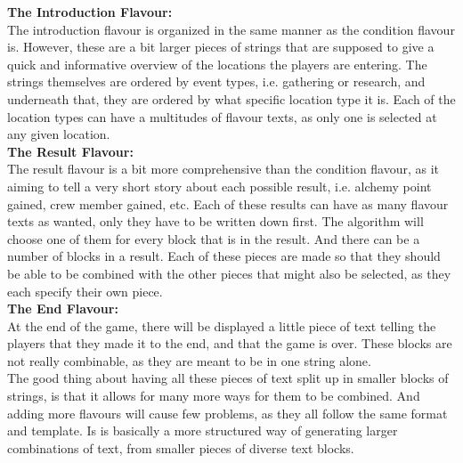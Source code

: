 \textbf{The Introduction Flavour:}\\

The introduction flavour is organized in the same manner as the condition flavour is. However, these are a bit larger pieces of strings that are supposed to give a quick and informative overview of the locations the players are entering. The strings themselves are ordered by event types, i.e. gathering or research, and underneath that, they are ordered by what specific location type it is. Each of the location types can have a multitudes of flavour texts, as only one is selected at any given location.\\

\textbf{The Result Flavour:}\\

The result flavour is a bit more comprehensive than the  condition flavour, as it aiming to tell a very short story about each possible result, i.e. alchemy point gained, crew member gained, etc.
Each of these results can have as many flavour texts as wanted, only they have to be written down first. The algorithm will choose one of them for every block that is in the result. And there can be a number of blocks in a result. Each of these pieces are made so that they should be able to be combined with the other pieces that might also be selected, as they each specify their own piece. \\

\textbf{The End Flavour:}\\

At the end of the game, there will be displayed a little piece of text telling the players that they made it to the end, and that the game is over. These blocks are not really combinable, as they are meant to be in one string alone.\\

The good thing about having all these pieces of text split up in smaller blocks of strings, is that it allows for many more ways for them to be combined. And adding more flavours will cause few problems, as they all follow the same format and template. Is is basically a more structured way of generating larger combinations of text, from smaller pieces of diverse text blocks.\\\\


